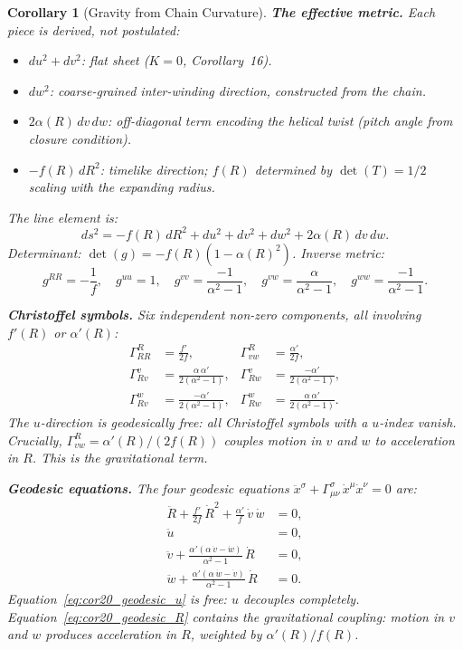\documentclass[12pt]{amsart}
\newtheorem{corollary}{Corollary}
\begin{document}
\begin{corollary}[Gravity from Chain Curvature]
\medskip
\textbf{The effective metric.}  Each piece is derived, not postulated:
\begin{itemize}
\item $du^2 + dv^2$: flat sheet ($K=0$, Corollary~16).
\item $dw^2$: coarse-grained inter-winding direction, constructed from the chain.
\item $2\alpha(R)\, dv\, dw$: off-diagonal term encoding the helical twist (pitch angle
      from closure condition).
\item $-f(R)\, dR^2$: timelike direction; $f(R)$ determined by $\det(T) = 1/2$ scaling
      with the expanding radius.
\end{itemize}
The line element is:
\[
  ds^2 = -f(R)\, dR^2 + du^2 + dv^2 + dw^2 + 2\alpha(R)\, dv\, dw.
\]
Determinant: $\det(g) = -f(R)(1 - \alpha(R)^2)$.  Inverse metric:
\[
  g^{RR} = -\frac{1}{f},\quad g^{uu} = 1,\quad
  g^{vv} = \frac{-1}{\alpha^2 - 1},\quad
  g^{vw} = \frac{\alpha}{\alpha^2 - 1},\quad
  g^{ww} = \frac{-1}{\alpha^2 - 1}.
\]

\medskip
\textbf{Christoffel symbols.}  Six independent non-zero components, all involving
$f'(R)$ or $\alpha'(R)$:
\begin{align}
  \Gamma^R_{RR} &= \frac{f'}{2f}, &
  \Gamma^R_{vw} &= \frac{\alpha'}{2f}, \label{eq:cor20_gamma_key} \\[4pt]
  \Gamma^v_{Rv} &= \frac{\alpha\, \alpha'}{2(\alpha^2 - 1)}, &
  \Gamma^v_{Rw} &= \frac{-\alpha'}{2(\alpha^2 - 1)}, \\[4pt]
  \Gamma^w_{Rv} &= \frac{-\alpha'}{2(\alpha^2 - 1)}, &
  \Gamma^w_{Rw} &= \frac{\alpha\, \alpha'}{2(\alpha^2 - 1)}.
\end{align}
The $u$-direction is geodesically free: all Christoffel symbols with a $u$-index vanish.
Crucially, $\Gamma^R_{vw} = \alpha'(R)/(2f(R))$ couples motion in $v$ and $w$ to
acceleration in $R$.  This is the gravitational term.

\medskip
\textbf{Geodesic equations.}  The four geodesic equations
$\ddot{x}^\sigma + \Gamma^\sigma_{\mu\nu}\, \dot{x}^\mu \dot{x}^\nu = 0$ are:
\begin{align}
  \ddot{R} + \frac{f'}{2f}\, \dot{R}^2
    + \frac{\alpha'}{f}\, \dot{v}\, \dot{w} &= 0,
    \label{eq:cor20_geodesic_R} \\[4pt]
  \ddot{u} &= 0, \label{eq:cor20_geodesic_u} \\[4pt]
  \ddot{v} + \frac{\alpha'(\alpha\, \dot{v} - \dot{w})}{\alpha^2 - 1}\, \dot{R} &= 0,
    \label{eq:cor20_geodesic_v} \\[4pt]
  \ddot{w} + \frac{\alpha'(\alpha\, \dot{w} - \dot{v})}{\alpha^2 - 1}\, \dot{R} &= 0.
    \label{eq:cor20_geodesic_w}
\end{align}
Equation~\eqref{eq:cor20_geodesic_u} is free: $u$ decouples completely.
Equation~\eqref{eq:cor20_geodesic_R} contains the gravitational coupling: motion in $v$ and
$w$ produces acceleration in $R$, weighted by $\alpha'(R)/f(R)$.


\end{corollary}
\end{document}
